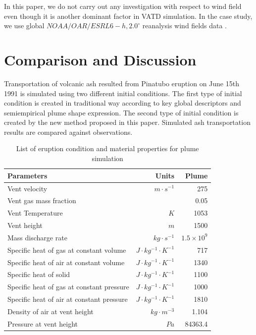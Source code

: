 \documentclass[draft,linenumbers]{agujournal2019}
\begin{document}
In this paper, we do not carry out any investigation with respect to wind field even though it is another dominant factor in VATD simulation. In the case study, we use global $NOAA/OAR/ESRL 6-h, 2.0^{\circ}$ reanalysis wind fields data \citep{whitaker2004reanalysis, compo2006feasibility, compo2011twentieth}.

\section{Comparison and Discussion}

Transportation of volcanic ash resulted from Pinatubo eruption on June 15th 1991 is simulated using two different initial conditions.
The first type of initial condition is created in traditional way according to key global descriptors and semiempirical plume shape expression. The second type of  initial condition is created by the new method proposed in this paper.  Simulated ash transportation results are compared against observations. 

\begin{table}[htp]
	\centering
      \caption{List of eruption condition and material properties for plume simulation}		
	  \begin{tabular}{lrr}
	    \hline
	    Parameters & Units & Plume \\
	    \hline
	    Vent velocity          & $m\cdot s^{-1}$  & 275 \\
	    Vent gas mass fraction &                  & 0.05 \\
	    Vent Temperature       & $K$              & 1053 \\
	    Vent height            & $m$              & 1500 \\
	    Mass discharge rate    & $kg\cdot s^{-1}$ & $1.5 \times 10^9$\\
	    	Specific heat of gas at constant volume     & $J \cdot kg^{-1}\cdot K^{-1}$ & 717     \\
	    Specific heat of air at constant volume     & $J \cdot kg^{-1}\cdot K^{-1}$ & 1340    \\
	    	Specific heat of solid                      & $J \cdot kg^{-1}\cdot K^{-1}$ & 1100    \\
	    	Specific heat of gas at constant pressure   & $J \cdot kg^{-1}\cdot K^{-1}$ & 1000    \\
	    	Specific heat of air at constant pressure   & $J \cdot kg^{-1}\cdot K^{-1}$ & 1810    \\
	    	Density of air at vent height               & $kg \cdot m^{-3}$       & 1.104   \\
	    Pressure at vent height                     & $Pa$                    & 84363.4 \\
	    \hline
	  \end{tabular}
	  \label{tab:input_parameters_plume_simulation}
\end{table}
\end{document}
